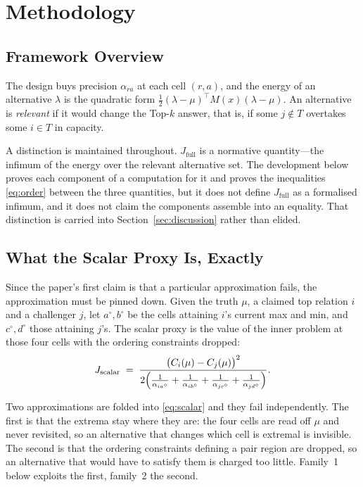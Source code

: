 \documentclass[conference]{IEEEtran}
\theoremstyle{definition}
\begin{document}
\section{Methodology}
\label{sec:setting}

\subsection{Framework Overview}

The design buys precision $\alpha_{ra}$ at each cell $(r,a)$, and the energy of an
alternative $\lambda$ is the quadratic form
$\tfrac12(\lambda-\mu)^{\top}M(x)(\lambda-\mu)$. An alternative is \emph{relevant} if it
would change the Top-$k$ answer, that is, if some $j\notin T$ overtakes some $i\in T$ in
capacity.

A distinction is maintained throughout. $J_{\mathrm{full}}$ is a normative quantity---the
infimum of the energy over the relevant alternative set. The development below proves each
component of a computation for it and proves the inequalities \eqref{eq:order} between the
three quantities, but it does not define $J_{\mathrm{full}}$ as a formalised infimum, and it
does not claim the components assemble into an equality. That distinction is carried into
Section~\ref{sec:discussion} rather than elided.

\subsection{What the Scalar Proxy Is, Exactly}
\label{sec:proxydef}

Since the paper's first claim is that a particular approximation fails, the approximation
must be pinned down. Given the truth $\mu$, a claimed top relation $i$ and a challenger $j$,
let $a^{\circ},b^{\circ}$ be the cells attaining $i$'s current max and min, and
$c^{\circ},d^{\circ}$ those attaining $j$'s. The scalar proxy is the value of the inner
problem at those four cells with the ordering constraints dropped:
\begin{equation}
J_{\mathrm{scalar}}
\;=\;
\frac{\bigl(C_{i}(\mu)-C_{j}(\mu)\bigr)^{2}}
     {2\Bigl(\frac{1}{\alpha_{ia^{\circ}}}+\frac{1}{\alpha_{ib^{\circ}}}
            +\frac{1}{\alpha_{jc^{\circ}}}+\frac{1}{\alpha_{jd^{\circ}}}\Bigr)} .
\label{eq:scalar}
\end{equation}

Two approximations are folded into \eqref{eq:scalar} and they fail independently. The first
is that the extrema stay where they are: the four cells are read off $\mu$ and never
revisited, so an alternative that changes which cell is extremal is invisible. The second is
that the ordering constraints defining a pair region are dropped, so an alternative that
would have to satisfy them is charged too little. Family~1 below exploits the first, family~2
the second.
\end{document}
